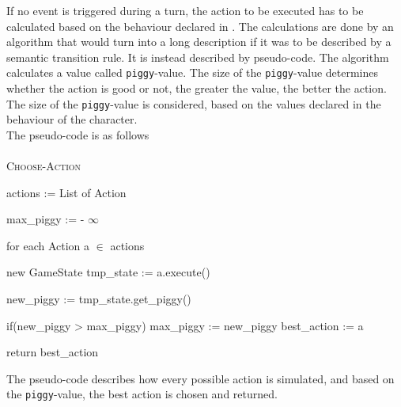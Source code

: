 If no event is triggered during a turn, the action to be executed has to be calculated based on the behaviour declared in \langname{}.
The calculations are done by an algorithm that would turn into a long description if it was to be described by a semantic transition rule. It is instead described by pseudo-code.
The algorithm calculates a value called \texttt{piggy}-value. The size of the \texttt{piggy}-value determines whether the action is good or not, the greater the value, the better the action.
The size of the \texttt{piggy}-value is considered, based on the values declared in the behaviour of the character.\\
The pseudo-code is as follows \\\\
\textsc{Choose-Action}
\begin{algorithm}
actions := List of Action

max\_piggy := - $\infty$\;

for each Action a $\in$ actions{

    new GameState tmp\_state := a.execute()\;
    
    new\_piggy := tmp\_state.get\_piggy()\;
    
    if(new\_piggy > max\_piggy){
        max\_piggy := new\_piggy\;
        best\_action := a\;
        }
    }
return best\_action\;
\end{algorithm}

The pseudo-code describes how every possible action is simulated, and based on the \texttt{piggy}-value, the best action is chosen and returned.


\begin{comment}
Missing:
Behaviour
\end{comment}


%

